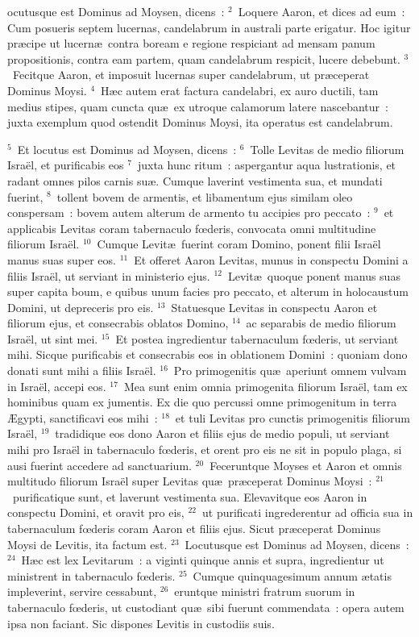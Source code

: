 \bchapter
{}ocutusque est Dominus ad Moysen, dicens~:
${}^{2}$~Loquere Aaron, et dices ad eum~: Cum posueris septem lucernas, candelabrum in australi parte erigatur. Hoc igitur pr\ae cipe ut lucern\ae\ contra boream e regione respiciant ad mensam panum propositionis, contra eam partem, quam candelabrum respicit, lucere debebunt.
${}^{3}$~Fecitque Aaron, et imposuit lucernas super candelabrum, ut pr\ae ceperat Dominus Moysi.
${}^{4}$~H\ae c autem erat factura candelabri, ex auro ductili, tam medius stipes, quam cuncta qu\ae\ ex utroque calamorum latere nascebantur~: juxta exemplum quod ostendit Dominus Moysi, ita operatus est candelabrum.


${}^{5}$~Et locutus est Dominus ad Moysen, dicens~:
${}^{6}$~Tolle Levitas de medio filiorum Isra\"el, et purificabis eos
${}^{7}$~juxta hunc ritum~: aspergantur aqua lustrationis, et radant omnes pilos carnis su\ae . Cumque laverint vestimenta sua, et mundati fuerint,
${}^{8}$~tollent bovem de armentis, et libamentum ejus similam oleo conspersam~: bovem autem alterum de armento tu accipies pro peccato~:
${}^{9}$~et applicabis Levitas coram tabernaculo fœderis, convocata omni multitudine filiorum Isra\"el.
${}^{10}$~Cumque Levit\ae\ fuerint coram Domino, ponent filii Isra\"el manus suas super eos.
${}^{11}$~Et offeret Aaron Levitas, munus in conspectu Domini a filiis Isra\"el, ut serviant in ministerio ejus.
${}^{12}$~Levit\ae\ quoque ponent manus suas super capita boum, e quibus unum facies pro peccato, et alterum in holocaustum Domini, ut depreceris pro eis.
${}^{13}$~Statuesque Levitas in conspectu Aaron et filiorum ejus, et consecrabis oblatos Domino,
${}^{14}$~ac separabis de medio filiorum Isra\"el, ut sint mei.
${}^{15}$~Et postea ingredientur tabernaculum fœderis, ut serviant mihi. Sicque purificabis et consecrabis eos in oblationem Domini~: quoniam dono donati sunt mihi a filiis Isra\"el.
${}^{16}$~Pro primogenitis qu\ae\ aperiunt omnem vulvam in Isra\"el, accepi eos.
${}^{17}$~Mea sunt enim omnia primogenita filiorum Isra\"el, tam ex hominibus quam ex jumentis. Ex die quo percussi omne primogenitum in terra \AE gypti, sanctificavi eos mihi~:
${}^{18}$~et tuli Levitas pro cunctis primogenitis filiorum Isra\"el,
${}^{19}$~tradidique eos dono Aaron et filiis ejus de medio populi, ut serviant mihi pro Isra\"el in tabernaculo fœderis, et orent pro eis ne sit in populo plaga, si ausi fuerint accedere ad sanctuarium.
${}^{20}$~Feceruntque Moyses et Aaron et omnis multitudo filiorum Isra\"el super Levitas qu\ae\ pr\ae ceperat Dominus Moysi~:
${}^{21}$~purificatique sunt, et laverunt vestimenta sua. Elevavitque eos Aaron in conspectu Domini, et oravit pro eis,
${}^{22}$~ut purificati ingrederentur ad officia sua in tabernaculum fœderis coram Aaron et filiis ejus. Sicut pr\ae ceperat Dominus Moysi de Levitis, ita factum est.
${}^{23}$~Locutusque est Dominus ad Moysen, dicens~:
${}^{24}$~H\ae c est lex Levitarum~: a viginti quinque annis et supra, ingredientur ut ministrent in tabernaculo fœderis.
${}^{25}$~Cumque quinquagesimum annum \ae tatis impleverint, servire cessabunt,
${}^{26}$~eruntque ministri fratrum suorum in tabernaculo fœderis, ut custodiant qu\ae\ sibi fuerunt commendata~: opera autem ipsa non faciant. Sic dispones Levitis in custodiis suis.


